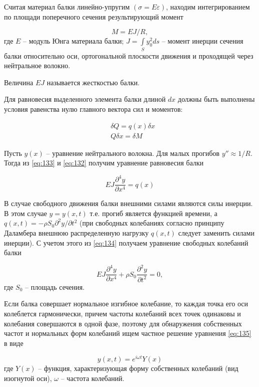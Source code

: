 \documentclass[specialist, subf, href, colorlinks=true, 14pt, final]{disser}
\theoremstyle{definition}
\newcommand{\pdfrac}[2]{\frac{\partial #1}{\partial #2}}
\begin{document}
Считая материал балки линейно-упругим $(\sigma = E\varepsilon)$, находим интегрированием по площади поперечного сечения результирующий момент
\addtocounter{equation}{1}
\begin{equation}\label{eq:132}
  M = EJ/R,
  \tag{2}
\end{equation}
где $E$ -- модуль Юнга материала балки; $J = \int\limits_{S}y_{0}^{2}ds$ -- момент инерции сечения балки относительно оси, ортогональной плоскости движения и проходящей через нейтральное волокно.

Величина $EJ$ называется жесткостью балки.

Для равновесия выделенного элемента балки длиной $dx$ должны быть выполнены условия равенства нулю главного вектора сил и моментов:
\addtocounter{equation}{1}
\begin{equation}\label{eq:133}
  \begin{aligned}
  & \delta Q = q(x)\delta x\\
  & Q\delta x = \delta M
  \end{aligned}
  \tag{3}
\end{equation}

Пусть $y(x)$ -- уравнение нейтрального волокна. Для малых прогибов $y'' \approx 1/R$. Тогда из \eqref{eq:133} и \eqref{eq:132} получим уравнение равновесия балки
\addtocounter{equation}{1}
\begin{equation}\label{eq:134}
  EJ\pdfrac{^{4}y}{x^4} = q(x)
  \tag{4}
\end{equation}

В случае свободного движения балки внешними силами являются силы инерции. В этом случае $y=y(x,t)$ т.е. прогиб является функцией времени, а $q(x,t) = -\rho S_{0} \partial^{2}y/\partial t^2$ (при свободных колебаниях согласно принципу Даламбера внешнюю распределенную нагрузку $q(x,t)$ следует заменить силами инерции). С учетом этого из \eqref{eq:134} получаем уравнение свободных колебаний балки
\addtocounter{equation}{1}
\begin{equation}\label{eq:135}
  EJ\pdfrac{^{4}y}{x^4} + \rho S_{0}\pdfrac{^{2}y}{t^2} = 0,
  \tag{5}
\end{equation}
где $S_0$ -- площадь сечения.

Если балка совершает нормальное изгибное колебание, то каждая точка его оси колеблется гармонически, причем частоты колебаний всех точек одинаковы и колебания совершаются в одной фазе, поэтому для обнаружения собственных частот и нормальных форм колебаний ищем частное решение уравнения \eqref{eq:135} в виде
\addtocounter{equation}{1}
\begin{equation}\label{eq:136}
  y(x, t) = e^{i\omega t} Y(x)
  \tag{6}
\end{equation}
где $Y(x)$ -- функция, характеризующая форму собственных колебаний (вид изогнутой оси), $\omega$ -- частота колебаний.
\end{document}
